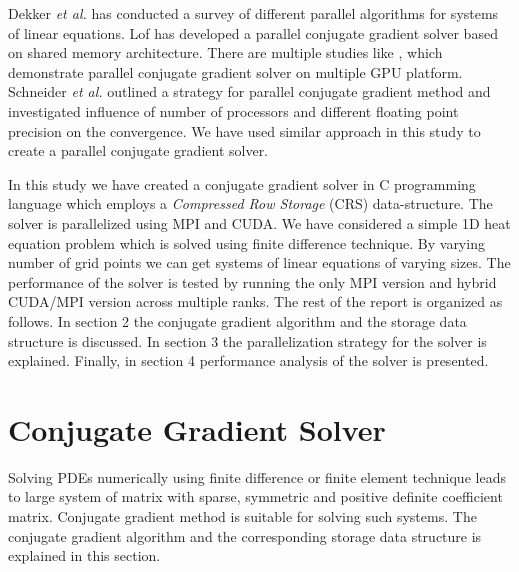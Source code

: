 \documentclass[sigplan,screen]{acmart}
\begin{document}
Dekker \emph{et al.} \cite{pa} has conducted a survey of different parallel algorithms for systems of linear equations. Lof \cite{pa2} has developed a parallel conjugate gradient solver based on shared memory architecture. There are multiple studies like \cite{pa3}, \cite{pa4} which demonstrate parallel conjugate gradient solver on multiple GPU platform.  Schneider \emph{et al.} \cite{pa5} outlined a strategy for parallel conjugate gradient method and investigated influence of number of processors and different floating point precision on the convergence. We have used similar approach in this study to create a parallel conjugate gradient solver. 

In this study we have created a conjugate gradient solver in C programming language which employs a \emph{Compressed Row Storage} (CRS) data-structure. The solver is parallelized using MPI and CUDA. We have considered a simple 1D heat equation problem which is solved using finite difference technique. By varying number of grid points we can get systems of linear equations of varying sizes. The performance of the solver is tested by running the only MPI version and hybrid CUDA/MPI version across multiple ranks. The rest of the report is organized as follows. In section 2 the conjugate gradient algorithm and the storage data structure is discussed. In section 3 the parallelization strategy for the solver is explained. Finally, in section 4 performance analysis of the solver is presented. 

\section{Conjugate Gradient Solver}
Solving PDEs numerically using finite difference or finite element technique leads to large system of matrix with sparse, symmetric and positive definite coefficient matrix. Conjugate gradient method \cite{conjugate} is suitable for solving such systems. The conjugate gradient algorithm and the corresponding storage data structure is explained in this section. 
\end{document}
